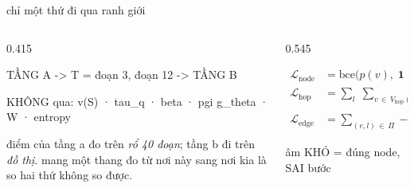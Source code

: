 \begin{frame}[fragile]{chỉ một thứ đi qua ranh giới}

  \begin{columns}[t]
  \begin{column}{0.415\textwidth}
    \begin{keyb}[title={giao diện}]
      \begin{dia}
TẦNG A -> T = {đoạn 3, đoạn 12} -> TẦNG B

KHÔNG qua: v(S) · tau_q · beta · pgi
           g_theta · W · entropy
      \end{dia}
      \vspace{0.25em}
      điểm của tầng a đo trên \emph{rổ 40 đoạn}; tầng b đi trên \emph{đồ thị}.
      mang một thang đo từ nơi này sang nơi kia là so hai thứ không so được.
    \end{keyb}
  \end{column}
  \begin{column}{0.545\textwidth}
    \begin{bx}[title={$T$ dùng làm nhãn để dạy bộ đi tìm}]
      \begin{align*}
        \mathcal{L}_{\text{node}} &= \mathrm{bce}\bigl(p(v),\; \mathbf{1}[v \in T]\bigr)\\[0.2em]
        \mathcal{L}_{\text{hop}}  &= \sum_{l}\;\sum_{v \,\in\, V_{\text{hop}}(l)}
          \mathrm{bce}\bigl(p^{(l)}(v),\; \mathbf{1}[(v,l) \in \Pi]\bigr)\\[0.2em]
        \mathcal{L}_{\text{edge}} &= \sum_{(e,l) \,\in\, \Pi}
          -\log \hat g_e^{(l)}
      \end{align*}
      \vspace{-0.3em}
      \begin{dia}
âm KHÓ = đúng node, SAI bước
      \end{dia}
    \end{bx}
  \end{column}
  \end{columns}
\end{frame}

